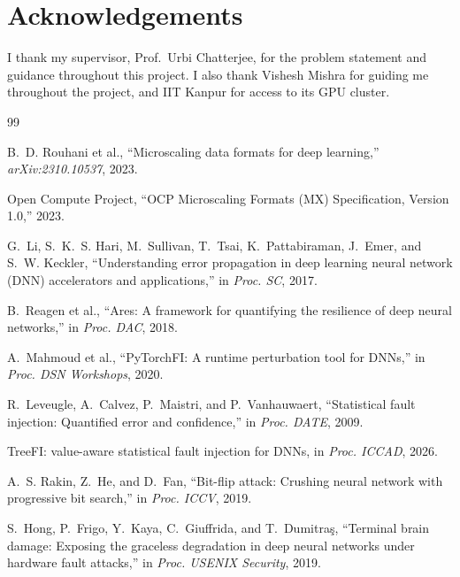 \documentclass[12pt,a4paper]{article}
\newcommand{\supervisor}{Prof.~Urbi Chatterjee}
\begin{document}
\section*{Acknowledgements}

I thank my supervisor, \supervisor, for the problem statement and guidance throughout this
project. I also thank Vishesh Mishra for guiding me throughout the project, and IIT Kanpur
for access to its GPU cluster.

\begin{thebibliography}{99}

B.~D. Rouhani et al., ``Microscaling data formats for deep learning,''
\emph{arXiv:2310.10537}, 2023.

Open Compute Project, ``OCP Microscaling Formats (MX) Specification, Version 1.0,'' 2023.

G.~Li, S.~K.~S. Hari, M.~Sullivan, T.~Tsai, K.~Pattabiraman, J.~Emer, and S.~W. Keckler,
``Understanding error propagation in deep learning neural network (DNN) accelerators and
applications,'' in \emph{Proc. SC}, 2017.

B.~Reagen et al., ``Ares: A framework for quantifying the resilience of deep neural
networks,'' in \emph{Proc. DAC}, 2018.

A.~Mahmoud et al., ``PyTorchFI: A runtime perturbation tool for DNNs,'' in \emph{Proc.
DSN Workshops}, 2020.

R.~Leveugle, A.~Calvez, P.~Maistri, and P.~Vanhauwaert, ``Statistical fault injection:
Quantified error and confidence,'' in \emph{Proc. DATE}, 2009.

TreeFI: value-aware statistical fault injection for DNNs, in \emph{Proc. ICCAD}, 2026.

A.~S. Rakin, Z.~He, and D.~Fan, ``Bit-flip attack: Crushing neural network with progressive
bit search,'' in \emph{Proc. ICCV}, 2019.

S.~Hong, P.~Frigo, Y.~Kaya, C.~Giuffrida, and T.~Dumitra\c{s}, ``Terminal brain damage:
Exposing the graceless degradation in deep neural networks under hardware fault attacks,''
in \emph{Proc. USENIX Security}, 2019.


\end{thebibliography}
\end{document}
